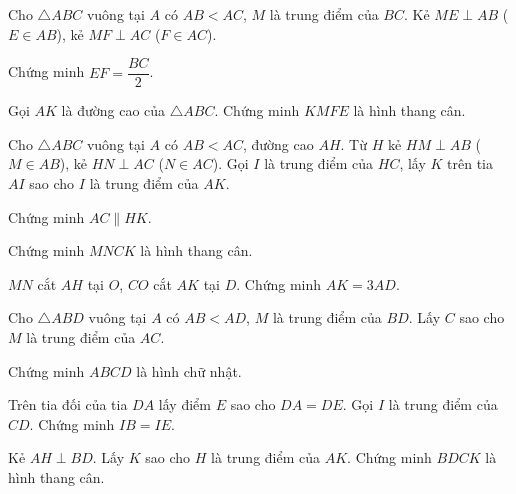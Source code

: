 \cau Cho $\triangle ABC$ vuông tại $A$ có $AB < AC$, $M$ là trung điểm của $BC$. Kẻ $ME \perp AB$ ($E \in AB$), kẻ $MF \perp AC$ ($F \in AC$).
\begin{tuluan}
    \item Chứng minh $EF = \dfrac{BC}{2}$.
    \item Gọi $AK$ là đường cao của $\triangle ABC$. Chứng minh $KMFE$ là hình thang cân.
\end{tuluan}

\cau Cho $\triangle ABC$ vuông tại $A$ có $AB < AC$, đường cao $AH$. Từ $H$ kẻ $HM \perp AB$ ($M \in AB$), kẻ $HN \perp AC$ ($N \in AC$). Gọi $I$ là trung điểm của $HC$, lấy $K$ trên tia $AI$ sao cho $I$ là trung điểm của $AK$.

\begin{tuluan}
    \item Chứng minh $AC \parallel HK$.
    \item Chứng minh $MNCK$ là hình thang cân.
    \item $MN$ cắt $AH$ tại $O$, $CO$ cắt $AK$ tại $D$. Chứng minh $AK = 3AD$.
\end{tuluan}

\cau Cho $\triangle ABD$ vuông tại $A$ có $AB < AD$, $M$ là trung điểm của $BD$. Lấy $C$ sao cho $M$ là trung điểm của $AC$.
\begin{tuluan}
    \item Chứng minh $ABCD$ là hình chữ nhật.
    \item Trên tia đối của tia $DA$ lấy điểm $E$ sao cho $DA = DE$. Gọi $I$ là trung điểm của $CD$. Chứng minh $IB = IE$.
    \item Kẻ $AH \perp BD$. Lấy $K$ sao cho $H$ là trung điểm của $AK$. Chứng minh $BDCK$ là hình thang cân.
\end{tuluan}
